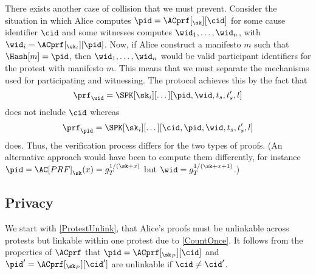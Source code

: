 There exists another case of collision that we must prevent.
Consider the situation in which Alice computes \(\pid = \ACprf[_\sk][\cid]\) for some cause identifier \(\cid\) and some witnesses computes \(\wid_1, \dotsc, \wid_n\), with \(\wid_i = \ACprf[_{\sk_i}][\pid]\).
Now, if Alice construct a manifesto \(m\) such that \(\Hash[m] = \pid\), then \(\wid_1, \dotsc, \wid_n\) would be valid participant identifiers for the protest with manifesto \(m\).
This means that we must separate the mechanisms used for participating and witnessing.
The protocol achieves this by the fact that \[
  \prf_{\wid} = \SPK[\sk_i][\dotsc][\pid, \wid, t_s, t_s', l]
\]
does not include \(\cid\) whereas \[
  \prf_{\pid} = \SPK[\sk_i][\dotsc][\cid, \pid, \wid, t_s, t_s', l]
\]
does.
Thus, the verification process differs for the two types of proofs.
(An alternative approach would have been to compute them differently, for instance \(\pid = \AC[PRF]_{\sk}(x) = g_T^{1/(\sk+x)}\) but \(\wid = g_T^{1/(\sk+x+1)}\).)

%
%

\subsection{Privacy}

We start with \cref{ProtestUnlink}, that Alice's proofs must be unlinkable across protests but linkable within one protest due to \cref{CountOnce}.
It follows from the properties of \(\ACprf\) that \(\pid =  \ACprf[_{\sk_P}][\cid]\) and \(\pid' = \ACprf[_{\sk_P}][\cid']\) are unlinkable if \(\cid\neq \cid'\).

